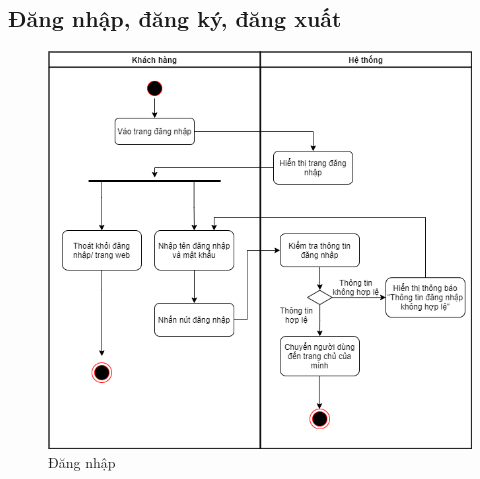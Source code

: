 \subsection{Đăng nhập, đăng ký, đăng xuất}

\begin{figure}[!h]
    \begin{center}
        \includegraphics[scale=0.6]{Images/ActivityDiagram/login.drawio.png}
    \end{center}
    \hspace{0.3cm}
    \caption{Đăng nhập}
\end{figure}

\newpage

